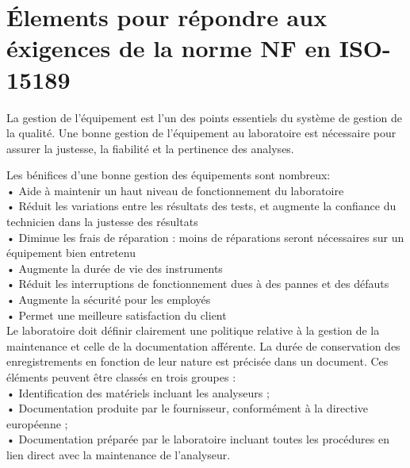 \section{Élements pour répondre aux éxigences de la norme NF en ISO-15189}
La gestion de l’équipement est l’un des points essentiels du système de gestion de la qualité.
Une bonne gestion de l’équipement au laboratoire est nécessaire pour assurer la justesse, 
la fiabilité et la pertinence des analyses.


Les bénifices d'une bonne gestion des équipements sont nombreux:\\
•	Aide à maintenir un haut niveau de fonctionnement du laboratoire\\
•	Réduit les variations entre les résultats des tests, et augmente la confiance du technicien dans la justesse des résultats\\
•	Diminue les frais de réparation : moins de réparations seront nécessaires sur un équipement bien entretenu\\
•	Augmente la durée de vie des instruments\\
•	Réduit les interruptions de fonctionnement dues à des pannes et des défauts\\
•	Augmente la sécurité pour les employés\\
•	Permet une meilleure satisfaction du client\\

Le laboratoire doit définir clairement une politique relative à la gestion de la maintenance et 
celle de la documentation afférente. La durée de conservation des enregistrements en fonction de 
leur nature est précisée dans un document. Ces éléments peuvent être classés en trois groupes :\\
•	Identification des matériels incluant les analyseurs ;\\
•	Documentation produite par le fournisseur, conformément à la directive européenne ;\\
•	Documentation préparée par le laboratoire incluant toutes les procédures en lien direct avec la maintenance de l'analyseur.\\
\pagebreak
